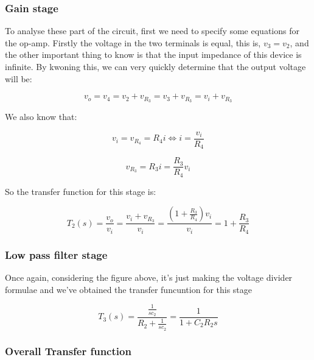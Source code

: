 \subsubsection{Gain stage}


To analyse these part of the circuit, first we need to specify some equations for the op-amp. 
Firstly the voltage in the two terminals is equal, this is, $v_3 = v_2$, and the other important thing to know is that the input impedance of this device is infinite. By kwoning this, we can very quickly determine that the output voltage will be:

\begin{equation}
v_o = v_4 = v_2 + v_{R_3} = v_3 + v_{R_3} = v_i + v_{R_3}
\end{equation} 

We also know that:

\begin{equation}
v_i = v_{R_4} = R_4i \iff i = \frac{v_i}{R_4}
\end{equation}

\begin{equation}
v_{R_3} = R_3i = \frac{R_3}{R_4}v_i
\end{equation}

So the transfer function for this stage is:

\begin{equation}
T_2(s) = \frac{v_o}{v_i} = \frac{v_i + v_{R_3}}{v_i} = \frac{(1+\frac{R_3}{R_4})v_i}{v_i} = 1 + \frac{R_3}{R_4}
\end{equation} 

\subsubsection{Low pass filter stage}


Once again, considering the figure above, it's just making the voltage divider formulae and we've obtained the transfer funcuntion for this stage

\begin{equation}
T_3(s) = \frac{\frac{1}{sc_2}}{R_2 + \frac{1}{sc_2}} = \frac{1}{1+ C_2R_2s}
\end{equation} 

\subsubsection{Overall Transfer function}

